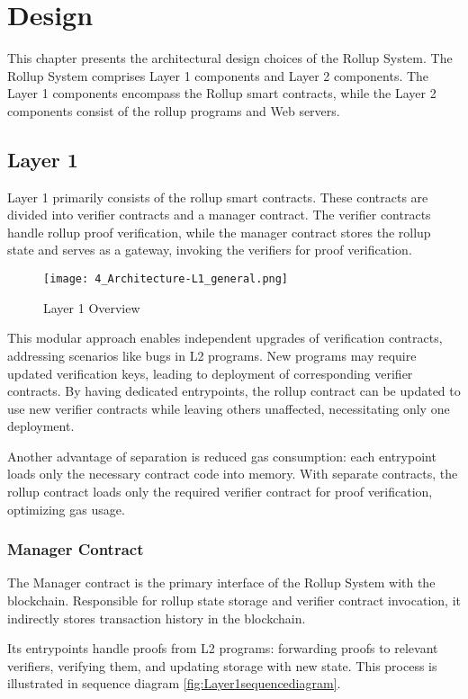 \chapter{Design\label{cha:chapter4}}
This chapter presents the architectural design choices of the Rollup System. The Rollup System comprises Layer 1 components and Layer 2 components. The Layer 1 components encompass the Rollup smart contracts, while the Layer 2 components consist of the rollup programs and Web servers.

\section{Layer 1\label{sec:designLayer1}}
Layer 1 primarily consists of the rollup smart contracts. These contracts are divided into verifier contracts and a manager contract. The verifier contracts handle rollup proof verification, while the manager contract stores the rollup state and serves as a gateway, invoking the verifiers for proof verification.

\begin{figure}[htb]
  \centering
  \texttt{[image: 4\_Architecture-L1\_general.png]}
  \caption{Layer 1 Overview}
  \label{fig:Layer1overview}
\end{figure}

This modular approach enables independent upgrades of verification contracts, addressing scenarios like bugs in L2 programs. New programs may require updated verification keys, leading to deployment of corresponding verifier contracts. By having dedicated entrypoints, the rollup contract can be updated to use new verifier contracts while leaving others unaffected, necessitating only one deployment.

Another advantage of separation is reduced gas consumption: each entrypoint loads only the necessary contract code into memory. With separate contracts, the rollup contract loads only the required verifier contract for proof verification, optimizing gas usage.

\subsection{Manager Contract\label{sec:designrollupcontract}}
The Manager contract is the primary interface of the Rollup System with the blockchain. Responsible for rollup state storage and verifier contract invocation, it indirectly stores transaction history in the blockchain.

Its entrypoints handle proofs from L2 programs: forwarding proofs to relevant verifiers, verifying them, and updating storage with new state. This process is illustrated in sequence diagram \ref{fig:Layer1sequencediagram}.


